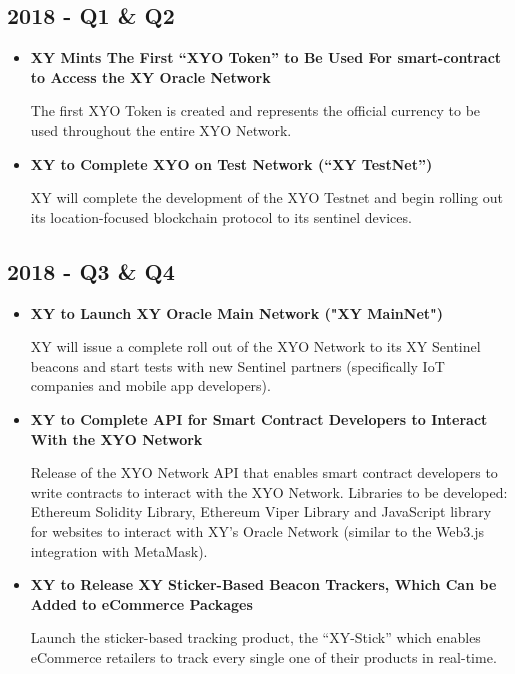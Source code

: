 \documentclass{article}
\begin{document}
\subsection{2018 - Q1 \& Q2 }
\begin{itemize}
\item \textbf{XY Mints The First ``XYO Token'' to Be Used For \Gls{smart-contract} to Access the XY Oracle Network}

The first XYO Token is created and represents the official currency to be used throughout the entire XYO Network.

\item \textbf{XY to Complete XYO on Test Network (``XY TestNet'')}

XY will complete the development of the XYO Testnet and begin rolling out its location-focused blockchain protocol to its \Gls{sentinel} devices.

\end{itemize}

\subsection{2018 - Q3 \& Q4}
\begin{itemize}
\item \textbf{XY to Launch XY Oracle Main Network ("XY MainNet")}

XY will issue a complete roll out of the XYO Network to its XY Sentinel beacons and start tests with new Sentinel partners (specifically IoT companies and mobile app developers).

\item \textbf{XY to Complete API for Smart Contract Developers to Interact With the XYO Network}

Release of the XYO Network API that enables smart contract developers to write contracts to interact with the XYO Network. Libraries to be developed: Ethereum Solidity Library, Ethereum Viper Library and JavaScript library for websites to interact with XY's Oracle Network (similar to the Web3.js integration with MetaMask).

\item \textbf{XY to Release XY Sticker-Based Beacon Trackers, Which Can be Added to eCommerce Packages}

Launch the sticker-based tracking product, the ``XY-Stick'' which enables eCommerce retailers to track every single one of their products in real-time.

\end{itemize}
\end{document}

